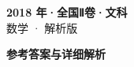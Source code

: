 \documentclass[zihao=-4, a4paper]{ctexart}
\begin{document}
\begin{center}
  {\Large\bfseries 2018 年·全国Ⅱ卷·文科}\\[4pt]
  {\large 数学 · 解析版}
\end{center}
\medskip
{}

\clearpage
{}
\begin{center}{\Large\bfseries 参考答案与详细解析}\end{center}
\medskip

\end{document}
